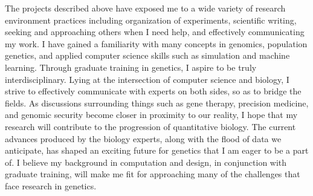 \documentclass[11pt]{amsart}
\begin{document}

The projects described above have exposed me to a wide variety of research environment practices including organization of experiments, scientific writing, seeking and approaching others when I need help, and effectively communicating my work. 
I have gained a familiarity with many concepts in genomics, population genetics, and applied computer science skills such as simulation and machine learning.
Through graduate training in genetics, I aspire to be truly interdisciplinary. 
Lying at the intersection of computer science and biology, I strive to effectively communicate with experts on both sides, so as to bridge the fields.  
As discussions surrounding things such as gene therapy, precision medicine, and genomic security become closer in proximity to our reality, I hope that my research will contribute to the progression of quantitative biology.
The current advances produced by the biology experts, along with the flood of data we anticipate, has shaped an exciting future for genetics that I am eager to be a part of. 
I believe my background in computation and design, in conjunction with graduate training, will make me fit for approaching many of the challenges that face research in genetics.
\end{document}
